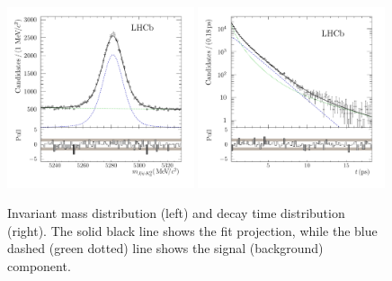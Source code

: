 \begin{figure}[htb]
\includegraphics[width=0.49\textwidth]{06-Bd2JpsiKS/tikz/pdf/MassPulls_summed.pdf}
\includegraphics[width=0.49\textwidth]{06-Bd2JpsiKS/tikz/pdf/obsTime_summed_pull_logy.pdf}
\caption{
Invariant mass distribution (left) and decay time distribution (right). The solid black line
shows the fit projection, while the blue dashed (green dotted) line shows the
signal (background) component.}
\label{fig:bd2jpsiks:nominalfit:mass_and_time}
\end{figure}
